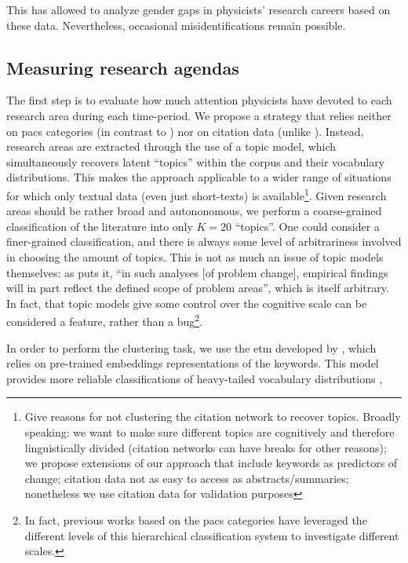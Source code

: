 \documentclass{article}
\begin{document}
This has allowed \citet{Strumia2021} to analyze gender gaps in physicists' research careers based on these data. Nevertheless, occasional misidentifications remain possible.

\subsection{\label{sec:topics}Measuring research agendas}

The first step is to evaluate how much attention physicists have devoted to each research area during each time-period. We propose a strategy that relies neither on \gls{pacs} categories (in contrast to \citealt{Jia2017,Battiston2019,Aleta2019,Tripodi2020}) nor on citation data (unlike \citealt{Zeng2019}). Instead, research areas are extracted through the use of a topic model, which simultaneously recovers latent ``topics'' within the corpus and their vocabulary distributions. This makes the approach applicable to a wider range of situations for which only textual data (even just short-texts) is available\footnote{Give reasons for not clustering the citation network to recover topics. Broadly speaking: we want to make sure different topics are cognitively and therefore linguistically divided (citation networks can have breaks for other reasons); we propose extensions of our approach that include keywords as predictors of change; citation data not as easy to access as abstracts/summaries; nonetheless we use citation data for validation purposes}.  Given research areas should be rather broad and autononomous, we perform a coarse-grained classification of the literature into only $K=20$ ``topics''. One could consider a finer-grained classification, and there is always some level of arbitrariness involved in choosing the amount of topics. This is not as much an issue of topic models themselves: as \citet{Gieryn1978} puts it, ``in such analyses [of problem change], empirical findings will in part reflect the defined scope of problem areas'', which is itself arbitrary. In fact, that topic models give some control over the cognitive scale can be considered a feature, rather than a bug\footnote{In fact, previous works based on the \gls{pacs} categories have leveraged the different levels of this hierarchical classification system to investigate different scales.}.

In order to perform the clustering task, we use the \gls{etm} developed by \citealt{Dieng2020}, which relies on pre-trained embeddings representations of the keywords. This model provides more reliable classifications of heavy-tailed vocabulary distributions%
,%
\end{document}
